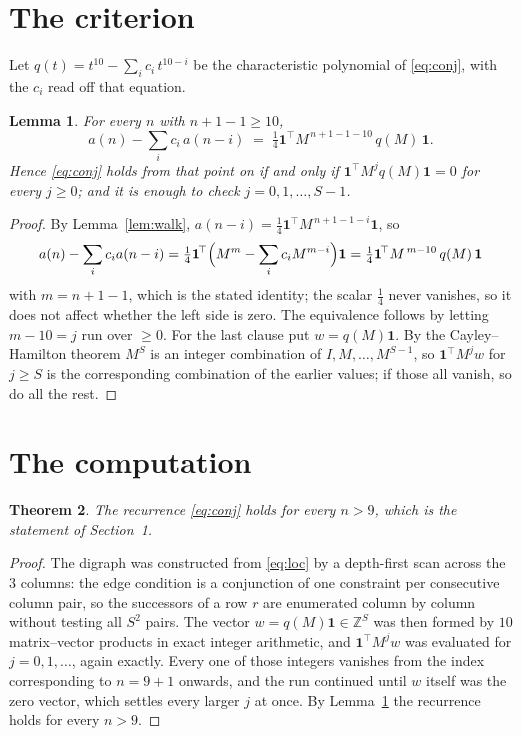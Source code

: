 \documentclass[11pt,a4paper]{article}
\theoremstyle{plain}
\newtheorem{theorem}{Theorem}
\newtheorem{lemma}[theorem]{Lemma}
\theoremstyle{definition}
\begin{document}
\section{The criterion}

Let $q(t)=t^{10}-\sum_i c_i\,t^{10-i}$ be the characteristic polynomial of
\eqref{eq:conj}, with the $c_i$ read off that equation.

\begin{lemma}\label{lem:crit}
For every $n$ with $n+1-1\ge10$,
\[
a(n)-\sum_i c_i\,a(n-i)\;=\;\tfrac1{4}\mathbf{1}^{\!\top}M^{\,n+1-1-10}\,q(M)\,\mathbf{1} .
\]
Hence \eqref{eq:conj} holds from that point on if and only if
$\mathbf{1}^{\!\top}M^{j}q(M)\mathbf{1}=0$ for every $j\ge0$; and it is enough to check
$j=0,1,\dots,S-1$.
\end{lemma}

\begin{proof}
By Lemma~\ref{lem:walk}, $a(n-i)=\tfrac1{4}\mathbf{1}^{\!\top}M^{\,n+1-1-i}\mathbf{1}$, so
\[
a(n)-\sum_i c_i a(n-i)
=\tfrac1{4}\mathbf{1}^{\!\top}\Bigl(M^{m}-\sum_i c_i M^{m-i}\Bigr)\mathbf{1}
=\tfrac1{4}\mathbf{1}^{\!\top}M^{\,m-10}\,q(M)\,\mathbf{1}
\]
with $m=n+1-1$, which is the stated identity; the scalar $\tfrac1{4}$ never vanishes, so
it does not affect whether the left side is zero. The equivalence follows by letting
$m-10=j$ run over $\ge0$. For the last clause put $w=q(M)\mathbf{1}$. By the
Cayley--Hamilton theorem $M^{S}$ is an integer combination of $I,M,\dots,M^{S-1}$, so
$\mathbf{1}^{\!\top}M^{j}w$ for $j\ge S$ is the corresponding combination of the earlier
values; if those all vanish, so do all the rest.
\end{proof}

\section{The computation}

\begin{theorem}
The recurrence \eqref{eq:conj} holds for every $n>9$, which is the statement of
Section~1.
\end{theorem}

\begin{proof}
The digraph was constructed from \eqref{eq:loc} by a depth-first scan across the $3$
columns: the edge condition is a conjunction of one constraint per consecutive column
pair, so the successors of a row $r$ are enumerated column by column without testing all
$S^2$ pairs. The vector $w=q(M)\mathbf{1}\in\mathbb{Z}^{S}$ was then formed by $10$
matrix--vector products in exact integer arithmetic, and $\mathbf{1}^{\!\top}M^{j}w$ was
evaluated for $j=0,1,\dots$, again exactly. Every one of those integers vanishes from the
index corresponding to $n=9+1$ onwards, and the run continued until $w$ itself was the
zero vector, which settles every larger $j$ at once. By Lemma~\ref{lem:crit} the recurrence
holds for every $n>9$.
\end{proof}
\end{document}
